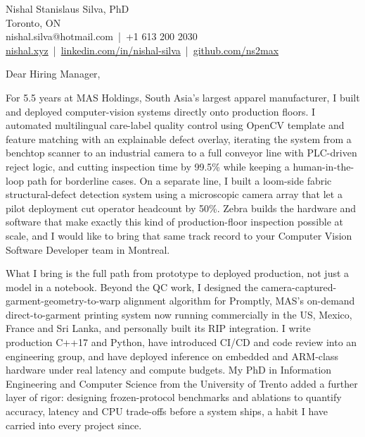 \documentclass[11pt]{article}
\begin{document}
\pagestyle{empty}

\noindent
Nishal Stanislaus Silva, PhD \\
Toronto, ON \\
nishal.silva@hotmail.com \,|\, +1 613 200 2030 \\
\href{https://nishal.xyz}{nishal.xyz} \,|\, \href{https://www.linkedin.com/in/nishal-silva}{linkedin.com/in/nishal-silva} \,|\, \href{https://github.com/ns2max}{github.com/ns2max}

\vspace{1em}
\noindent Dear Hiring Manager,

\vspace{1em}
\noindent For 5.5 years at MAS Holdings, South Asia's largest apparel manufacturer, I built and deployed computer-vision systems directly onto production floors. I automated multilingual care-label quality control using OpenCV template and feature matching with an explainable defect overlay, iterating the system from a benchtop scanner to an industrial camera to a full conveyor line with PLC-driven reject logic, and cutting inspection time by 99.5\% while keeping a human-in-the-loop path for borderline cases. On a separate line, I built a loom-side fabric structural-defect detection system using a microscopic camera array that let a pilot deployment cut operator headcount by 50\%. Zebra builds the hardware and software that make exactly this kind of production-floor inspection possible at scale, and I would like to bring that same track record to your Computer Vision Software Developer team in Montreal.

\vspace{1em}
\noindent What I bring is the full path from prototype to deployed production, not just a model in a notebook. Beyond the QC work, I designed the camera-captured-garment-geometry-to-warp alignment algorithm for Promptly, MAS's on-demand direct-to-garment printing system now running commercially in the US, Mexico, France and Sri Lanka, and personally built its RIP integration. I write production C++17 and Python, have introduced CI/CD and code review into an engineering group, and have deployed inference on embedded and ARM-class hardware under real latency and compute budgets. My PhD in Information Engineering and Computer Science from the University of Trento added a further layer of rigor: designing frozen-protocol benchmarks and ablations to quantify accuracy, latency and CPU trade-offs before a system ships, a habit I have carried into every project since.
\end{document}
